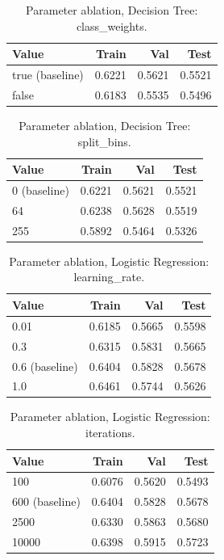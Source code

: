 \begin{table}[ht]
\centering
\small
\caption{Parameter ablation, Decision Tree: class\_weights.}
\label{tab:ablation-tree-class-weights}
\begin{tabular}{lrrr}
\toprule
Value & Train & Val & Test \\
\midrule
true (baseline) & 0.6221 & 0.5621 & 0.5521 \\
false & 0.6183 & 0.5535 & 0.5496 \\
\bottomrule
\end{tabular}
\end{table}

\begin{table}[ht]
\centering
\small
\caption{Parameter ablation, Decision Tree: split\_bins.}
\label{tab:ablation-tree-split-bins}
\begin{tabular}{lrrr}
\toprule
Value & Train & Val & Test \\
\midrule
0 (baseline) & 0.6221 & 0.5621 & 0.5521 \\
64 & 0.6238 & 0.5628 & 0.5519 \\
255 & 0.5892 & 0.5464 & 0.5326 \\
\bottomrule
\end{tabular}
\end{table}

\begin{table}[ht]
\centering
\small
\caption{Parameter ablation, Logistic Regression: learning\_rate.}
\label{tab:ablation-logistic-learning-rate}
\begin{tabular}{lrrr}
\toprule
Value & Train & Val & Test \\
\midrule
0.01 & 0.6185 & 0.5665 & 0.5598 \\
0.3 & 0.6315 & 0.5831 & 0.5665 \\
0.6 (baseline) & 0.6404 & 0.5828 & 0.5678 \\
1.0 & 0.6461 & 0.5744 & 0.5626 \\
\bottomrule
\end{tabular}
\end{table}

\begin{table}[ht]
\centering
\small
\caption{Parameter ablation, Logistic Regression: iterations.}
\label{tab:ablation-logistic-iterations}
\begin{tabular}{lrrr}
\toprule
Value & Train & Val & Test \\
\midrule
100 & 0.6076 & 0.5620 & 0.5493 \\
600 (baseline) & 0.6404 & 0.5828 & 0.5678 \\
2500 & 0.6330 & 0.5863 & 0.5680 \\
10000 & 0.6398 & 0.5915 & 0.5723 \\
\bottomrule
\end{tabular}
\end{table}

